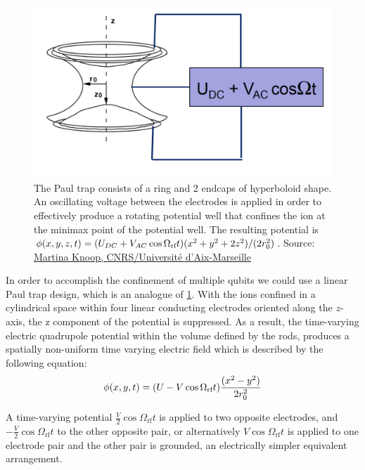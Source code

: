 \documentclass[../main.tex]{subfiles}
\begin{document}
\begin{figure}[!ht]
    \centering
    \includegraphics[scale = 0.2]{images/paulTrapApparatus.png}
    \caption{The Paul trap consists of a ring and 2 endcaps of hyperboloid shape. An oscillating voltage between the electrodes is applied in order to effectively produce a rotating potential well that confines the ion at the minimax point of the potential well. The resulting potential is $\phi(x,y,z,t) = (U_{DC} + V_{AC}\cos{\Omega_{\text{rf}}t})(x^2 + y^2 + 2z^2)/(2r_0^2)$. Source: \href{https://indico.cern.ch/event/315947/sessions/61194/attachments/606588/834751/Paul_traps_until_page_79.pdf}{Martina Knoop, CNRS/Université d’Aix-Marseille}}
    \label{fig: paul trap device}
\end{figure}


\par In order to accomplish the confinement of multiple qubits we could use a linear Paul trap design, which is an analogue of \cref{fig: paul trap device}. With the ions confined in a cylindrical space within four linear conducting electrodes oriented along the $z$-axis, the z component of the potential is suppressed. As a result, the time-varying electric quadrupole potential within the volume defined by the rods, produces a spatially non-uniform time varying electric field which is described by the following equation:
\begin{equation}
    \phi(x,y,t) = (U - V\cos{\Omega_{\text{rf}}t})\frac{(x^2-y^2)}{2r_0^2}
\end{equation}

\noindent A time-varying potential $\frac{V}{2}\cos{\Omega_{\text{rf}}t}$ is applied to two opposite electrodes, and $-\frac{V}{2}\cos{\Omega_{\text{rf}}t}$ to the other opposite pair, or alternatively $V\cos{\Omega_{\text{rf}}t}$ is applied to one electrode pair and the other pair is grounded, an electrically simpler equivalent arrangement.
\end{document}
